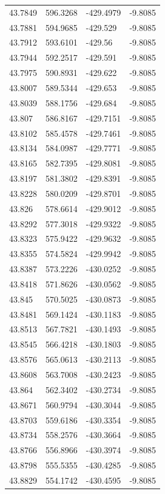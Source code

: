 \begin{table}[H]
\begin{tabular}{llll}
43.7849 & 596.3268 & -429.4979 & -9.8085 \\
43.7881 & 594.9685 & -429.529 & -9.8085 \\
43.7912 & 593.6101 & -429.56 & -9.8085 \\
43.7944 & 592.2517 & -429.591 & -9.8085 \\
43.7975 & 590.8931 & -429.622 & -9.8085 \\
43.8007 & 589.5344 & -429.653 & -9.8085 \\
43.8039 & 588.1756 & -429.684 & -9.8085 \\
43.807 & 586.8167 & -429.7151 & -9.8085 \\
43.8102 & 585.4578 & -429.7461 & -9.8085 \\
43.8134 & 584.0987 & -429.7771 & -9.8085 \\
43.8165 & 582.7395 & -429.8081 & -9.8085 \\
43.8197 & 581.3802 & -429.8391 & -9.8085 \\
43.8228 & 580.0209 & -429.8701 & -9.8085 \\
43.826 & 578.6614 & -429.9012 & -9.8085 \\
43.8292 & 577.3018 & -429.9322 & -9.8085 \\
43.8323 & 575.9422 & -429.9632 & -9.8085 \\
43.8355 & 574.5824 & -429.9942 & -9.8085 \\
43.8387 & 573.2226 & -430.0252 & -9.8085 \\
43.8418 & 571.8626 & -430.0562 & -9.8085 \\
43.845 & 570.5025 & -430.0873 & -9.8085 \\
43.8481 & 569.1424 & -430.1183 & -9.8085 \\
43.8513 & 567.7821 & -430.1493 & -9.8085 \\
43.8545 & 566.4218 & -430.1803 & -9.8085 \\
43.8576 & 565.0613 & -430.2113 & -9.8085 \\
43.8608 & 563.7008 & -430.2423 & -9.8085 \\
43.864 & 562.3402 & -430.2734 & -9.8085 \\
43.8671 & 560.9794 & -430.3044 & -9.8085 \\
43.8703 & 559.6186 & -430.3354 & -9.8085 \\
43.8734 & 558.2576 & -430.3664 & -9.8085 \\
43.8766 & 556.8966 & -430.3974 & -9.8085 \\
43.8798 & 555.5355 & -430.4285 & -9.8085 \\
43.8829 & 554.1742 & -430.4595 & -9.8085 \\

\end{tabular}
\end{table}
